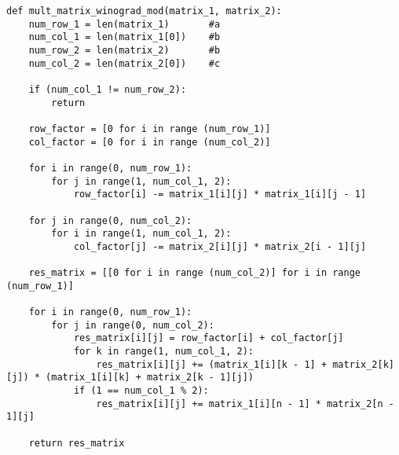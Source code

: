 \noindent\begin{minipage}{\textwidth}
\begin{lstlisting}[caption=Оптимизированный алгоритм Винограда]
def mult_matrix_winograd_mod(matrix_1, matrix_2):
    num_row_1 = len(matrix_1)       #a
    num_col_1 = len(matrix_1[0])    #b
    num_row_2 = len(matrix_2)       #b
    num_col_2 = len(matrix_2[0])    #c

    if (num_col_1 != num_row_2):
        return

    row_factor = [0 for i in range (num_row_1)]
    col_factor = [0 for i in range (num_col_2)]

    for i in range(0, num_row_1):
        for j in range(1, num_col_1, 2):
            row_factor[i] -= matrix_1[i][j] * matrix_1[i][j - 1]

    for j in range(0, num_col_2):
        for i in range(1, num_col_1, 2):
            col_factor[j] -= matrix_2[i][j] * matrix_2[i - 1][j]

    res_matrix = [[0 for i in range (num_col_2)] for i in range (num_row_1)]

    for i in range(0, num_row_1):
        for j in range(0, num_col_2):
            res_matrix[i][j] = row_factor[i] + col_factor[j]
            for k in range(1, num_col_1, 2):
                res_matrix[i][j] += (matrix_1[i][k - 1] + matrix_2[k][j]) * (matrix_1[i][k] + matrix_2[k - 1][j])
            if (1 == num_col_1 % 2):
                res_matrix[i][j] += matrix_1[i][n - 1] * matrix_2[n - 1][j]

    return res_matrix
\end{lstlisting}
\end{minipage}

